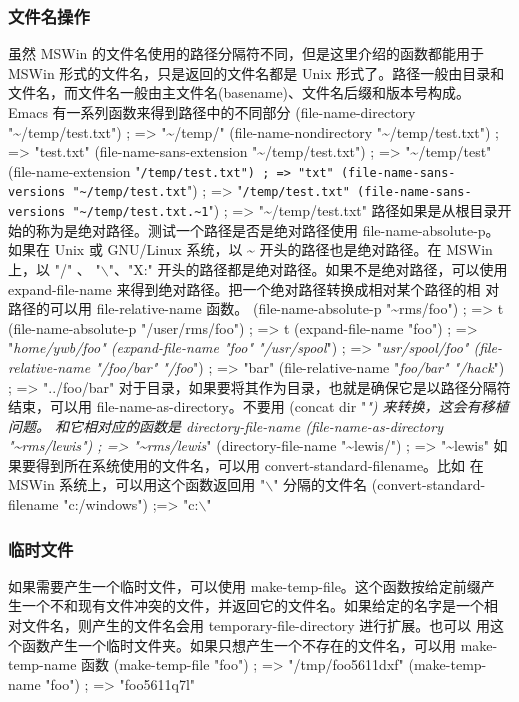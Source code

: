 \documentclass[11pt]{ctexart}
\begin{document}
{{{{\subsubsection{文件名操作}
\label{sec:orgc01c289}
虽然 MSWin 的文件名使用的路径分隔符不同，但是这里介绍的函数都能用于 MSWin 形式的文件名，只是返回的文件名都是 Unix 形式了。路径一般由目录和 文件名，而文件名一般由主文件名(basename)、文件名后缀和版本号构成。 Emacs 有一系列函数来得到路径中的不同部分
(file-name-directory "\textasciitilde{}/temp/test.txt")      ; => "\textasciitilde{}/temp/"
(file-name-nondirectory "\textasciitilde{}/temp/test.txt")   ; => "test.txt"
(file-name-sans-extension "\textasciitilde{}/temp/test.txt") ; => "\textasciitilde{}/temp/test"
(file-name-extension "\texttt{/temp/test.txt")      ; => "txt"
     (file-name-sans-versions "\textasciitilde{}/temp/test.txt}") ; => "\texttt{/temp/test.txt"
     (file-name-sans-versions "\textasciitilde{}/temp/test.txt.\textasciitilde{}1}") ; => "\textasciitilde{}/temp/test.txt"
路径如果是从根目录开始的称为是绝对路径。测试一个路径是否是绝对路径使用 file-name-absolute-p。如果在 Unix 或 GNU/Linux 系统，以 \textasciitilde{} 开头的路径也是绝对路径。在 MSWin 上，以 "/" 、 "$\backslash$"、"X:" 开头的路径都是绝对路径。如果不是绝对路径，可以使用 expand-file-name 来得到绝对路径。把一个绝对路径转换成相对某个路径的相 对路径的可以用 file-relative-name 函数。
(file-name-absolute-p "\textasciitilde{}rms/foo")       ; => t
(file-name-absolute-p "/user/rms/foo")  ; => t
(expand-file-name "foo")                ; => "\emph{home/ywb/foo"
(expand-file-name "foo" "/usr/spool}")  ; => "\emph{usr/spool/foo"
(file-relative-name "/foo/bar" "/foo}") ; => "bar"
(file-relative-name "\emph{foo/bar" "/hack}") ; => "../foo/bar"
对于目录，如果要将其作为目录，也就是确保它是以路径分隔符结束，可以用 file-name-as-directory。不要用 (concat dir "\emph{") 来转换，这会有移植问题。 和它相对应的函数是 directory-file-name
(file-name-as-directory "\textasciitilde{}rms/lewis")   ; => "\textasciitilde{}rms/lewis}"
(directory-file-name "\textasciitilde{}lewis/")         ; => "\textasciitilde{}lewis"
如果要得到所在系统使用的文件名，可以用 convert-standard-filename。比如 在 MSWin 系统上，可以用这个函数返回用 "$\backslash$" 分隔的文件名
(convert-standard-filename "c:/windows")  ;=> "c:$\backslash$\windows"
\subsubsection{临时文件}
\label{sec:org20eae2f}
如果需要产生一个临时文件，可以使用 make-temp-file。这个函数按给定前缀产 生一个不和现有文件冲突的文件，并返回它的文件名。如果给定的名字是一个相 对文件名，则产生的文件名会用 temporary-file-directory 进行扩展。也可以 用这个函数产生一个临时文件夹。如果只想产生一个不存在的文件名，可以用 make-temp-name 函数
(make-temp-file "foo")                  ; => "/tmp/foo5611dxf"
(make-temp-name "foo")                  ; => "foo5611q7l"
}}}}
\end{document}
